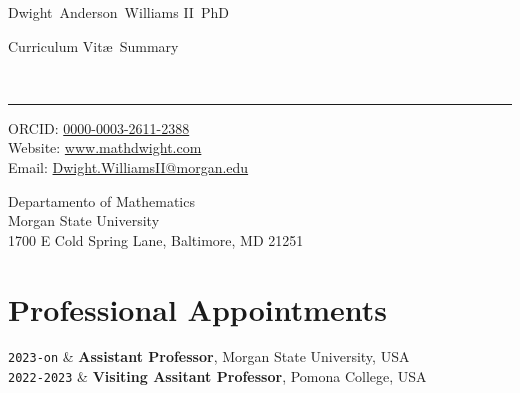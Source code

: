 \documentclass[10pt,a4paper]{article}
\makeatletter
\newcommand{\MSU}{Morgan State University}
\newcommand{\Pomona}{Pomona College}
\newcommand{\Title}{Curriculum Vit\ae\ Summary}
\newcommand{\FirstName}{Dwight}
\newcommand{\MiddleName}{Anderson}
\newcommand{\LastName}{Williams II}
\newcommand{\AcaSuffix}{PhD}
\newcommand{\MyName}{\FirstName\ \MiddleName\ \LastName\ \AcaSuffix}
\newcommand{\Email}{Dwight.WilliamsII@morgan.edu}
\newcommand{\PersonalWebsite}{www.mathdwight.com}
\newcommand{\ORCID}{0000-0003-2611-2388}
\newcommand{\Duration}[2]{\fontsize{10pt}{0}\selectfont \texttt{#1-#2}}
\newcommand{\Ongoing}{on}
\newcommand{\Website}[1]{\href{https://#1}{#1}}
\makeatother
\begin{document}
\begin{minipage}[t]{0.5\textwidth}
  {\fontsize{20pt}{0}\selectfont\MyName}
\end{minipage}
\begin{minipage}[t]{0.5\textwidth}
  \begin{flushright}
    \Title{}
  \end{flushright}
\end{minipage}
\\[-0.1cm]
\textcolor{lightgray}{\rule{\textwidth}{3pt}}
\begin{minipage}[t]{0.5\textwidth}
  ORCID: \href{https://orcid.org/\ORCID}{\ORCID}
  \\
  Website: \Website{\PersonalWebsite}
  \\
  Email: \href{mailto:\Email}{\Email}
\end{minipage}
\begin{minipage}[t]{0.5\textwidth}
  \begin{flushright}
  Departamento of Mathematics
  \\
  Morgan State University
  \\
  1700 E Cold Spring Lane, Baltimore, MD 21251
  \end{flushright}
\end{minipage}
\vspace{0.3cm}

\section{Professional Appointments}

\begin{EntriesTableDuration}
  \Duration{2023}{\Ongoing}  &
  \textbf{Assistant Professor}, \MSU, USA
  \\
  \Duration{2022}{2023}  &
  \textbf{Visiting Assitant Professor}, \Pomona, USA
\end{EntriesTableDuration}

\end{document}
